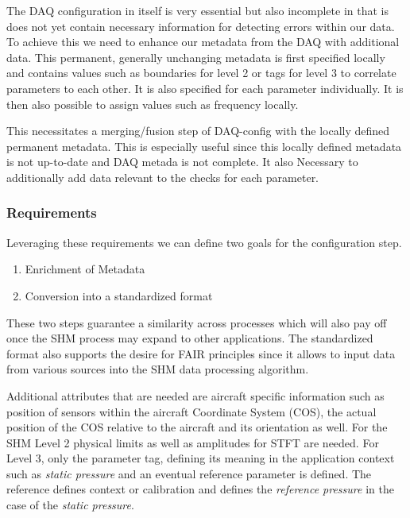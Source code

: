 
The DAQ configuration in itself is very essential but also incomplete in that is does not yet contain necessary information for detecting errors within our data. To achieve this we need to enhance our metadata from the DAQ with additional data. This permanent, generally unchanging metadata is first specified locally and contains values such as boundaries for level 2 or tags for level 3 to correlate parameters to each other. It is also specified for each parameter individually. It is then also possible to assign values such as frequency locally.



This necessitates a merging/fusion step of DAQ-config with the locally defined permanent metadata. This is especially useful since this locally defined metadata is not up-to-date and DAQ metada is not complete. It also Necessary to additionally add data relevant to the checks for each parameter.


\subsubsection{Requirements}

Leveraging these requirements we can define two goals for the configuration step.
\begin{enumerate}
    \item Enrichment of Metadata
    \item Conversion into a standardized format
\end{enumerate}
These two steps guarantee a similarity across processes which will also pay off once the SHM process may expand to other applications. The standardized format also supports the desire for FAIR principles since it allows to input data from various sources into the SHM data processing algorithm.

Additional attributes that are needed are aircraft specific information such as position of sensors within the aircraft Coordinate System (COS), the actual position of the COS relative to the aircraft and its orientation as well. For the SHM Level 2 physical limits as well as amplitudes for STFT are needed. For Level 3, only the parameter tag, defining its meaning in the application context such as \textit{static pressure} and an eventual reference parameter is defined. The reference defines context or calibration and defines the \textit{reference pressure} in the case of the \textit{static pressure}.

